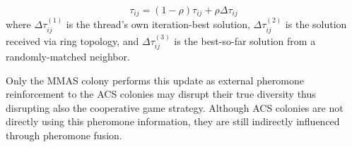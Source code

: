     \begin{equation}
            \tau_{ij} = (1 - \rho)\tau_{ij} + \rho\Delta \tau_{ij}
            \label{eqn:accum_update}
    \end{equation}
        where $\Delta \tau^{(1)}_{ij}$ is the thread’s own iteration-best solution, $\Delta \tau^{(2)}_{ij}$ is the solution received via ring topology, and $\Delta \tau^{(3)}_{ij}$ is the best-so-far solution from a randomly-matched neighbor.
    
    Only the MMAS colony performs this update as external pheromone reinforcement to the ACS colonies may disrupt their true diversity thus disrupting also the cooperative game strategy. Although ACS colonies are not directly using this pheromone information, they are still indirectly influenced through pheromone fusion.  








